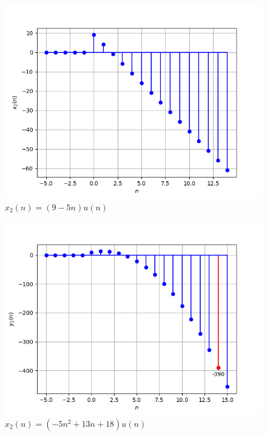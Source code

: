 \documentclass[journal,12pt,twocolumn]{IEEEtran}
\theoremstyle{remark}
\begin{document}
\begin{enumerate}
    \begin{figure}[!h] 
    \centering
    \includegraphics[width=\columnwidth]{ncert-maths/10/5/3/10/figs/signal_x2.png}
    \caption{$x_2(n)=(9-5n)u(n)$}
    \label{fig:Graph3_math.10.5.3.10}
    \end{figure}

    \begin{figure}[!h] 
    \centering
    \includegraphics[width=\columnwidth]{ncert-maths/10/5/3/10/figs/signal_y2.png}
    \caption{$x_2(n)=(-5n^2+13n+18)u(n)$}
    \label{fig:Graph4_math.10.5.3.10}
    \end{figure}

\end{enumerate}
\end{document}
